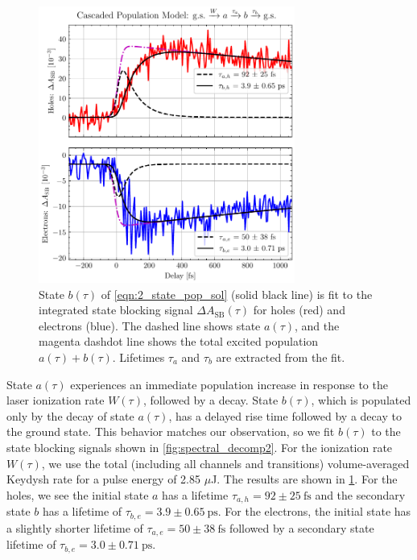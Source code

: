 \begin{figure}
	\centering
	\includegraphics[width=0.75\textwidth]{figures/chap4/SB_eh_2state_model.pdf}
	\caption{State $b(\tau)$ of \cref{eqn:2_state_pop_sol} (solid black line) is fit to the integrated state blocking signal $\Delta A_{\textrm{SB}}(\tau)$ for holes (red) and electrons (blue). The dashed line shows state $a(\tau)$, and the magenta dashdot line shows the total excited population $a(\tau)+b(\tau)$. Lifetimes $\tau_a$ and $\tau_b$ are extracted from the fit.}
	\label{fig:SB_eh_2state_model}
\end{figure}


State $a(\tau)$ experiences an immediate population increase in response to the laser ionization rate $W(\tau)$, followed by a decay. State $b(\tau)$, which is populated only by the decay of state $a(\tau)$, has a delayed rise time followed by a decay to the ground state. This behavior matches our observation, so we fit $b(\tau)$ to the state blocking signals shown in \cref{fig:spectral_decomp2}. For the ionization rate $W(\tau)$, we use the total (including all channels and transitions) volume-averaged Keydysh rate for a pulse energy of 2.85 $\mu$J. The results are shown in \cref{fig:SB_eh_2state_model}. For the holes, we see the initial state $a$ has a lifetime $\tau_{a,h} = 92 \pm 25 \ \textrm{fs}$ and the secondary state $b$ has a lifetime of $\tau_{b,e} = 3.9 \pm 0.65 \ \textrm{ps}$. For the electrons, the initial state has a slightly shorter lifetime of ${\tau_{a,e} = 50 \pm 38 \ \textrm{fs}}$ followed by a secondary state lifetime of ${\tau_{b,e} = 3.0 \pm 0.71 \ \textrm{ps}}$.

